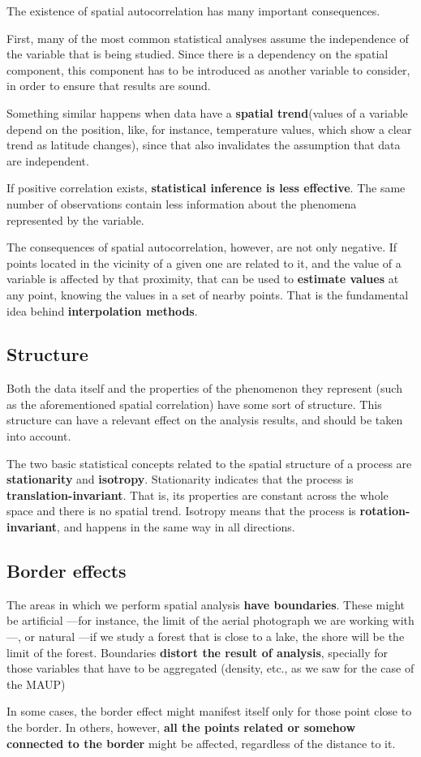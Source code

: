 The existence of spatial autocorrelation has many important consequences.

First, many of the most common statistical analyses assume the independence of the variable that is being studied. Since there is a dependency on the spatial component, this component has to be introduced as another variable to consider, in order to ensure that results are sound.


Something similar happens when data have a \textbf{spatial trend}(values of a variable depend on the position, like, for instance, temperature values, which show a clear trend as latitude changes), since that also invalidates the assumption that data are independent.

If positive correlation exists, \textbf{statistical inference is less effective}. The same number of observations contain less information about the phenomena represented by the variable.

The consequences of spatial autocorrelation, however, are not only negative. If points located in the vicinity of a given one are related to it, and the value of a variable is affected by that proximity, that can be used to \textbf{estimate values} at any point, knowing the values in a set of nearby points. That is the fundamental idea behind \textbf{interpolation methods}.


\subsection{Structure}

Both the data itself and the properties of the phenomenon they represent (such as the aforementioned spatial correlation) have some sort of structure. This structure can have a relevant effect on the analysis results, and should be taken into account.

The two basic statistical concepts related to the spatial structure of a process are \textbf{stationarity} and \textbf{isotropy}. Stationarity indicates that the process is \textbf{translation-invariant}. That is, its properties are constant across the whole space and there is no spatial trend. Isotropy means that the process is \textbf{rotation-invariant}, and happens in the same way in all directions.

\subsection{Border effects}

The areas in which we perform spatial analysis \textbf{have boundaries}. These might be artificial ---for instance, the limit of the aerial photograph we are working with---, or natural ---if we study a forest that is close to a lake, the shore will be the limit of the forest. Boundaries \textbf{distort the result of analysis}, specially for those variables that have to be aggregated (density, etc., as we saw for the case of the MAUP)

In some cases, the border effect might manifest itself only for those point close to the border. In others, however, \textbf{all the points related or somehow connected to the border} might be affected, regardless of the distance to it.

\pagestyle{empty}
